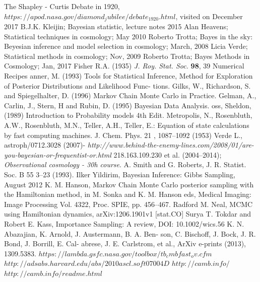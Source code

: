 \documentclass[onecolumn,           %
               showpacs,            %
               preprintnumbers,     %
               aps,                 %
               prl,          	    %
               letterpaper,             %
               superscriptaddress,      %
               nofootinbib,         %
               tightenlines,        %
               floats,floatfix      %
               ,usenatbib,
               ]{revtex4-1}
\begin{document}
\begin{thebibliography}{9}
 The Shapley - Curtis Debate in 1920, $https://apod.nasa.gov/diamond_jubilee/debate_1920.html$, visited on December 2017
B.J.K. Kleijin; Bayesian statistic, lecture notes 2015
 Alan Heavens; Statistical techniques in cosmology; May 2010
 Roberto Trotta; Bayes in the sky: Beyesian inference and model selection in cosmology; March, 2008
 Licia Verde; Statistical methods in cosmology; Nov, 2009
Roberto Trotta; Bayes Methods in Cosmology; Jan, 2017
Fisher R.A. (1935) \textit{J. Roy. Stat. Soc.} \textbf{98}, 39
Numerical Recipes
anner, M. (1993)
Tools for Statistical Inference, Method for
Exploration of Posterior Distributions and Likelihood Func-
tions.
Gilks, W., Richardson, S. and Spiegelhalter, D. (1996)
Markov Chain
Monte Carlo in Practice.
Gelman, A., Carlin, J., Stern, H and Rubin, D. (1995)
Bayesian Data
Analysis.
oss, Sheldon, (1989)
Introduction to Probability models 4th
Edit.
 Metropolis, N., Rosenbluth, A.W., Rosenbluth, M.N., Teller, A.H., Teller, E.: Equation of state
calculations by fast computing machines. J. Chem. Phys.
21
, 1087–1092 (1953)
 Verde L., astroph/0712.3028 (2007)-
\textit{http://www.behind-the-enemy-lines.com/2008/01/are-you-bayesian-or-frequentist-or.html}
218.163.109.230 et al. (2004–2014); \textit{Observational cosmology -
30h course}.
 A. Smith and G. Roberts, J. R. Statist. Soc. B
55
3–23 (1993).
 Ilker Yildirim, Bayesian Inference: Gibbs Sampling, August 2012
K. M. Hanson, Markov Chain Monte Carlo posterior sampling with the Hamiltonian method, in M. Sonka and K. M. Hanson eds, Medical Imaging: Image Processing
Vol. 4322, Proc. SPIE, pp. 456–467.
 Radford M. Neal, MCMC using Hamiltonian dynamics, arXiv:1206.1901v1 [stat.CO]
 Surya T. Tokdar and Robert E. Kass, Importance Sampling: A review, DOI: 10.1002/wics.56
%
%
%
%
 K. N. Abazajian, K. Arnold, J. Austermann, B. A. Ben-
son, C. Bischoff, J. Bock, J. R. Bond, J. Borrill, E. Cal-
abrese,  J.  E.  Carlstrom,  et  al.,  ArXiv  e-prints  (2013),
1309.5383.
$https://lambda.gsfc.nasa.gov/toolbox/tb_cmbfast_ov.cfm$
$http://adsabs.harvard.edu/abs/2010ascl.soft07004D$
$http://camb.info/$
$http://camb.info/readme.html$

\end{thebibliography}
\end{document}
